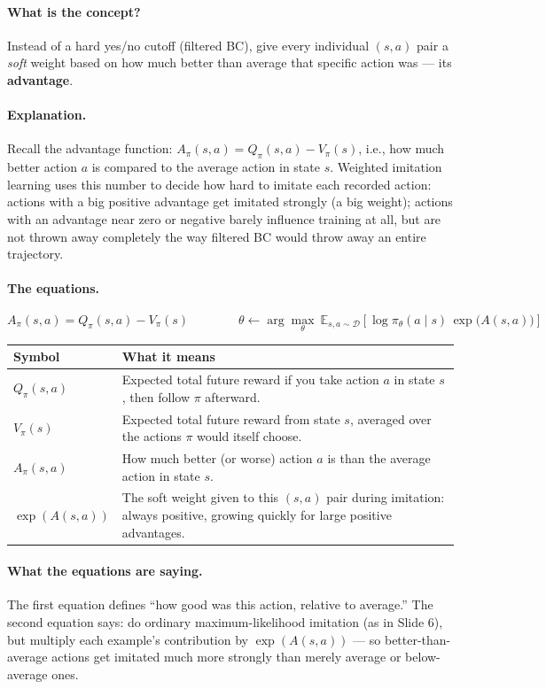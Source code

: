 \documentclass[11pt]{article}
\begin{document}
\paragraph{What is the concept?}
Instead of a hard yes/no cutoff (filtered BC), give every individual $(s,a)$ pair a
\emph{soft} weight based on how much better than average that specific action was ---
its \textbf{advantage}.

\paragraph{Explanation.}
Recall the advantage function: $A_\pi(s,a) = Q_\pi(s,a) - V_\pi(s)$, i.e., how much
better action $a$ is compared to the average action in state $s$. Weighted imitation
learning uses this number to decide how hard to imitate each recorded action: actions
with a big positive advantage get imitated strongly (a big weight); actions with an
advantage near zero or negative barely influence training at all, but are not thrown
away completely the way filtered BC would throw away an entire trajectory.

\paragraph{The equations.}
$$A_\pi(s,a) = Q_\pi(s,a) - V_\pi(s) \qquad\qquad
\theta \leftarrow \arg\max_\theta\ \mathbb{E}_{s,a\sim\mathcal{D}}\left[\log \pi_\theta(a\mid s)\,
\exp\big(A(s,a)\big)\right]$$

\begin{center}
\begin{tabular}{@{}p{3.2cm}p{10.3cm}@{}}
\toprule
Symbol & What it means \\
\midrule
$Q_\pi(s,a)$ & Expected total future reward if you take action $a$ in state $s$, then
follow $\pi$ afterward. \\
$V_\pi(s)$ & Expected total future reward from state $s$, averaged over the actions
$\pi$ would itself choose. \\
$A_\pi(s,a)$ & How much better (or worse) action $a$ is than the average action in
state $s$. \\
$\exp(A(s,a))$ & The soft weight given to this $(s,a)$ pair during imitation: always
positive, growing quickly for large positive advantages. \\
\bottomrule
\end{tabular}
\end{center}

\paragraph{What the equations are saying.}
The first equation defines ``how good was this action, relative to average.'' The
second equation says: do ordinary maximum-likelihood imitation (as in Slide 6), but
multiply each example's contribution by $\exp(A(s,a))$ --- so better-than-average
actions get imitated much more strongly than merely average or below-average ones.
\end{document}

